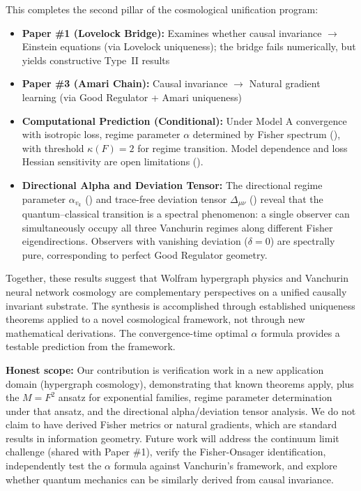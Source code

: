 \documentclass[11pt,a4paper]{article}
\theoremstyle{plain}
\theoremstyle{definition}
\theoremstyle{remark}
\begin{document}
This completes the second pillar of the cosmological unification program:
\begin{itemize}[noitemsep]
\item \textbf{Paper \#1 (Lovelock Bridge):} Examines whether causal invariance $\to$ Einstein equations (via Lovelock uniqueness); the bridge fails numerically, but yields constructive Type~II results
\item \textbf{Paper \#3 (Amari Chain):} Causal invariance $\to$ Natural gradient learning (via Good Regulator + Amari uniqueness)
\item \textbf{Computational Prediction (Conditional):} Under Model A convergence with isotropic loss, regime parameter $\alpha$ determined by Fisher spectrum (), with threshold $\kappa(F) = 2$ for regime transition. Model dependence and loss Hessian sensitivity are open limitations ().
\item \textbf{Directional Alpha and Deviation Tensor:} The directional regime parameter $\alpha_{v_k}$ () and trace-free deviation tensor $\Delta_{\mu\nu}$ () reveal that the quantum--classical transition is a spectral phenomenon: a single observer can simultaneously occupy all three Vanchurin regimes along different Fisher eigendirections. Observers with vanishing deviation ($\delta = 0$) are spectrally pure, corresponding to perfect Good Regulator geometry.
\end{itemize}

Together, these results suggest that Wolfram hypergraph physics and Vanchurin neural network cosmology are complementary perspectives on a unified causally invariant substrate. The synthesis is accomplished through established uniqueness theorems applied to a novel cosmological framework, not through new mathematical derivations. The convergence-time optimal $\alpha$ formula provides a testable prediction from the framework.

\textbf{Honest scope:} Our contribution is verification work in a new application domain (hypergraph cosmology), demonstrating that known theorems apply, plus the $M = F^2$ ansatz for exponential families, regime parameter determination under that ansatz, and the directional alpha/deviation tensor analysis. We do not claim to have derived Fisher metrics or natural gradients, which are standard results in information geometry. Future work will address the continuum limit challenge (shared with Paper \#1), verify the Fisher-Onsager identification, independently test the $\alpha$ formula against Vanchurin's framework, and explore whether quantum mechanics can be similarly derived from causal invariance.
\end{document}
